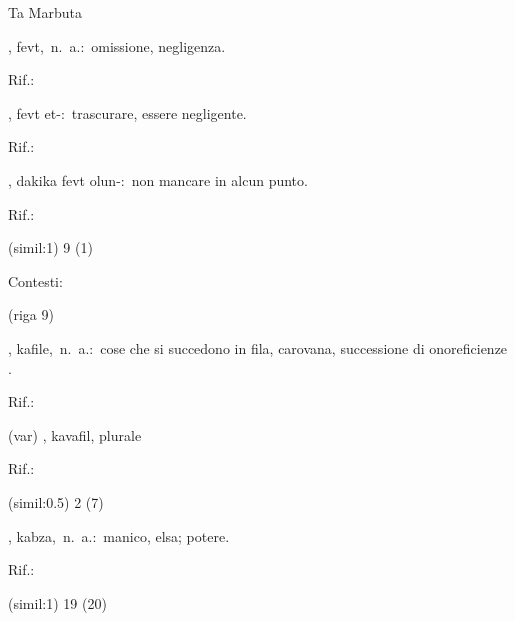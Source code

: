 \begin{glossario}{Ta Marbuta}
\begin{subvocedue}
\end{subvocedue}
\item[{\color{colorlowref}\spzrl{fawt}},] {\sf fevt},\ n.\ a.:\ omissione, negligenza.
\begin{subvocedue}
\item[Rif.:] 
\end{subvocedue}
\begin{subvocedue}
\item[\subglossariobullet] , {\sf fevt et-}:\ trascurare, essere negligente.
\begin{subvocedue}
\item[Rif.:] 
\end{subvocedue}
\item[\subglossariobullet] , {\sf dakika fevt olun-}:\ non mancare in alcun punto.
\begin{subvocedue}
\item[Rif.:] 
\end{subvocedue}
\item[(simil:1)]   9 (1)
\end{subvocedue}


Contesti:
\begin{subvocedue}
\item[(riga 9)] 
\end{subvocedue}
\item[{\color{colorlowref}\spzrl{qAfila_H}},] {\sf kafile},\ n.\ a.:\ cose che  si succedono in  fila,  carovana, successione  di  onoreficienze \verificare.
\begin{subvocedue}
\item[Rif.:] 
\end{subvocedue}
\begin{subvocedue}
\item[(var)] , {\sf kavafil}, plurale\begin{subvocedue}
\item[Rif.:] 
\end{subvocedue}
\item[(simil:0.5)]   2 (7)
\end{subvocedue}
\item[{\color{colorlowref}\spzrl{qab.da_T}},] {\sf kabza},\ n.\ a.:\ manico,  elsa; potere.
\begin{subvocedue}
\item[Rif.:] 
\end{subvocedue}
\begin{subvocedue}
\item[(simil:1)]   19 (20)
\end{subvocedue}



\end{glossario}
